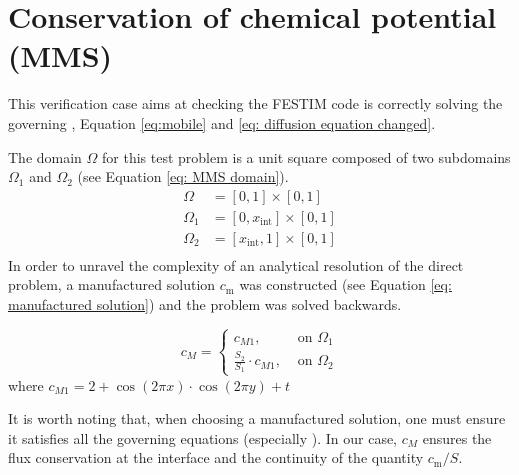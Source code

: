 \section{Conservation of chemical potential (MMS)}

This verification case aims at checking the FESTIM code is correctly solving the governing , Equation \ref{eq:mobile} and \ref{eq: diffusion equation changed}.

The domain $\Omega$ for this test problem is a unit square composed of two subdomains $\Omega_1$ and $\Omega_2$ (see Equation \ref{eq: MMS domain}).
\begin{subequations} \label{eq: MMS domain}
\begin{align}
    \Omega &= [0, 1] \times [0, 1] \\
    \Omega_1 &= [0, x_\mathrm{int}] \times [0, 1] \\
    \Omega_2 &= [x_\mathrm{int}, 1] \times [0, 1] \\
\end{align}
\end{subequations}
In order to unravel the complexity of an analytical resolution of the direct problem, a manufactured solution $c_\mathrm{m}$ was constructed (see Equation \ref{eq: manufactured solution}) and the problem was solved backwards.

\begin{equation}
        c_M= 
\begin{cases}
    c_{M1},& \text{ on } \Omega_1\\
    \frac{S_2}{S_1} \cdot c_{M1},& \text{ on } \Omega_2
\end{cases}
\label{eq: manufactured solution}
\end{equation}
where $c_{M1} = 2 + \cos(2\pi x) \cdot \cos(2\pi y) + t$

It is worth noting that, when choosing a manufactured solution, one must ensure it satisfies all the governing equations (especially ).
In our case, $c_M$ ensures the flux conservation at the interface and the continuity of the quantity $c_\mathrm{m}/S$.

